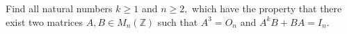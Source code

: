 Find all natural numbers $ k\ge 1 $ and $ n\ge 2, $ which have the property that there exist two matrices $ A,B\in M_n\left(\mathbb{Z}\right) $ such that $ A^3=O_n $ and $ A^kB +BA=I_n. $